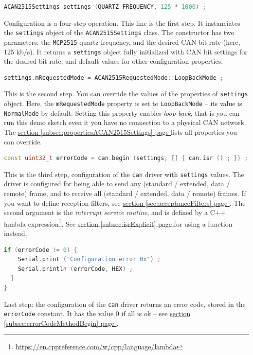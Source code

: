\documentclass[10pt, a4paper, obeyspaces, openany]{extarticle}
\newcommand\refSectionPage[1]{\hyperref[sec:#1]{section \ref*{sec:#1} page \pageref{sec:#1}}}
\newcommand\refSubsectionPage[1]{\hyperref[subsec:#1]{section \ref*{subsec:#1} page \pageref{subsec:#1}}}
\begin{document}
{ \small\begin{lstlisting}[language=c++]
  ACAN2515Settings settings (QUARTZ_FREQUENCY, 125 * 1000) ;
\end{lstlisting}}

Configuration is a four-step operation. This line is the first step. It instanciates the \texttt{settings} object of the \texttt{ACAN2515Settings} class. The constructor has two parameters: the \texttt{MCP2515} quartz frequency, and the desired CAN bit rate (here, 125 kb/s). It returns a \texttt{settings} object fully initialized with CAN bit settings for the desired bit rate, and default values for other configuration properties.






{ \small\begin{lstlisting}[language=c++]
  settings.mRequestedMode = ACAN2515RequestedMode::LoopBackMode ;
\end{lstlisting}}
This is the second step. You can override the values of the properties of \texttt{settings} object. Here, the \texttt{mRequestedMode} property is set to \texttt{LoopBackMode} -- its value is \texttt{NormalMode} by default. Setting this property enables \emph{loop back}, that is you can run this demo sketch even it you have no connection to a physical CAN network. The \refSubsectionPage{propertiesACAN2515Settings} lists all properties you can override.





{ \small\begin{lstlisting}[language=c++]
  const uint32_t errorCode = can.begin (settings, [] { can.isr () ; }) ;
\end{lstlisting}}
This is the third step, configuration of the \texttt{can} driver with \texttt{settings} values. The driver is configured for being able to send any (standard / extended, data / remote) frame, and to receive all (standard / extended, data / remote) frames. If you want to define reception filters, see \refSectionPage{acceptanceFilters}. The second argument is the \emph{interrupt service routine}, and is defined by a C++ lambda expression\footnote{\url{https://en.cppreference.com/w/cpp/language/lambda}}. See \refSubsectionPage{isrExplicit} for using a function instead.





{ \small\begin{lstlisting}[language=c++]
  if (errorCode != 0) {
    Serial.print ("Configuration error 0x") ;
    Serial.println (errorCode, HEX) ;
  }
}
\end{lstlisting}}
Last step: the configuration of the \texttt{can} driver returns an error code, stored in the \texttt{errorCode} constant. It has the value $0$ if all is ok -- see \refSubsectionPage{errorCodeMethodBegin}.
\end{document}
